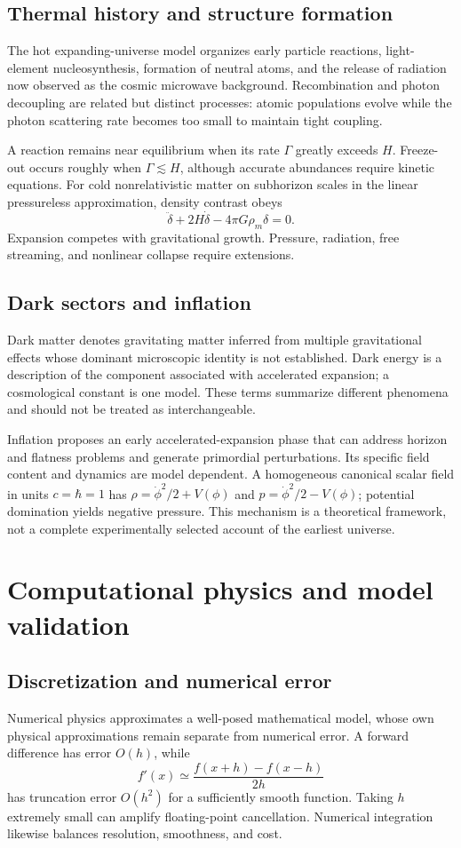 \documentclass[11pt,oneside]{book}
\theoremstyle{reviewstyle}
\begin{document}
\section{Thermal history and structure formation}
The hot expanding-universe model organizes early particle reactions, light-element nucleosynthesis, formation of neutral atoms, and the release of radiation now observed as the cosmic microwave background. Recombination and photon decoupling are related but distinct processes: atomic populations evolve while the photon scattering rate becomes too small to maintain tight coupling.

A reaction remains near equilibrium when its rate $\Gamma$ greatly exceeds $H$. Freeze-out occurs roughly when $\Gamma\lesssim H$, although accurate abundances require kinetic equations. For cold nonrelativistic matter on subhorizon scales in the linear pressureless approximation, density contrast obeys
\begin{equation}\ddot\delta+2H\dot\delta-4\pi G\rho_m\delta=0.\end{equation}
Expansion competes with gravitational growth. Pressure, radiation, free streaming, and nonlinear collapse require extensions.
\section{Dark sectors and inflation}
Dark matter denotes gravitating matter inferred from multiple gravitational effects whose dominant microscopic identity is not established. Dark energy is a description of the component associated with accelerated expansion; a cosmological constant is one model. These terms summarize different phenomena and should not be treated as interchangeable.

Inflation proposes an early accelerated-expansion phase that can address horizon and flatness problems and generate primordial perturbations. Its specific field content and dynamics are model dependent. A homogeneous canonical scalar field in units $c=\hbar=1$ has $\rho=\dot\phi^2/2+V(\phi)$ and $p=\dot\phi^2/2-V(\phi)$; potential domination yields negative pressure. This mechanism is a theoretical framework, not a complete experimentally selected account of the earliest universe.

\chapter{Computational physics and model validation}
\section{Discretization and numerical error}
Numerical physics approximates a well-posed mathematical model, whose own physical approximations remain separate from numerical error. A forward difference has error $O(h)$, while
\begin{equation}f'(x)\simeq\frac{f(x+h)-f(x-h)}{2h}\end{equation}
has truncation error $O(h^2)$ for a sufficiently smooth function. Taking $h$ extremely small can amplify floating-point cancellation. Numerical integration likewise balances resolution, smoothness, and cost.
\end{document}
